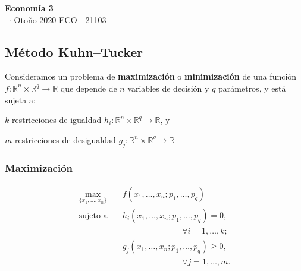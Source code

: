 \documentclass[8pt,a4paper]{extarticle}
\renewcommand{\csClass}{Economía 3}
\renewcommand{\csClassCode}{ECO - 21103}
\renewcommand{\csTerm}{Otoño 2020}
\begin{document}
\begin{titlepage}
	\begin{center}
		\vspace*{1cm}
		\Huge
		\textbf{\csClass}
		\vspace{0.5cm} \\
		\Large
		\cs\ $\cdot$ \csTerm
		\vfill
		\csAuthorName
		\vspace{0.8cm}
		\csClassCode\\
		\csSchool
	\end{center}
\end{titlepage}

\begin{multicols}{3}
	\setcounter{page}{1}

	\section*{Método Kuhn–Tucker}

	Consideramos un problema de \textbf{maximización} o \textbf{minimización} de una función $f : \mathbb{R}^n \times \mathbb{R}^q \to \mathbb{R}$ que depende de $n$ variables de decisión y $q$ parámetros, y está sujeta a:

	\begin{bulletlist}
		\item $k$ restricciones de igualdad $h_i : \mathbb{R}^n \times \mathbb{R}^q \to \mathbb{R}$, y
		\item $m$ restricciones de desigualdad $g_j : \mathbb{R}^n \times \mathbb{R}^q \to \mathbb{R}$
	\end{bulletlist}

	\subsubsection*{Maximización}

	\begin{equation*}
		\begin{aligned}
			\max_{\{x_1, \ldots, x_n\}}\  & f(x_1, \ldots, x_n; p_1, \ldots, p_q)          \\
			\text{sujeto a} \quad         & h_i(x_1, \ldots, x_n; p_1, \ldots, p_q) = 0,   \\ & \qquad \qquad \qquad \quad \, \forall i = 1, \ldots, k; \\
			                              & g_j(x_1, \ldots, x_n; p_1, \ldots, p_q) \ge 0, \\ & \qquad \qquad \qquad \quad \, \forall j = 1, \ldots, m.
		\end{aligned}
	\end{equation*}


\end{multicols}
\end{document}

